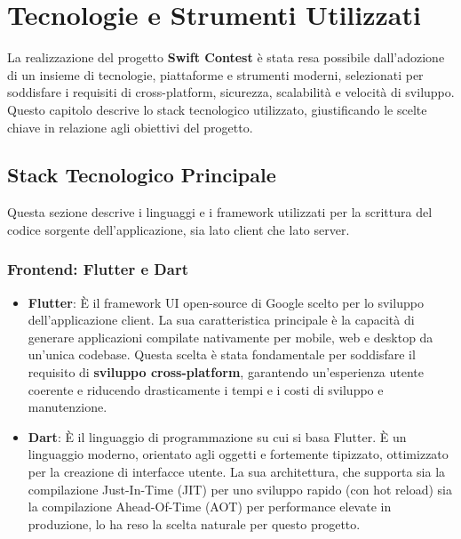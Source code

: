 
\chapter{Tecnologie e Strumenti Utilizzati}\label{ch:tecnologie-e-strumenti-utilizzati}

La realizzazione del progetto \textbf{Swift Contest} è stata resa possibile dall'adozione di un insieme di tecnologie, piattaforme e strumenti moderni, selezionati per soddisfare i requisiti di cross-platform, sicurezza, scalabilità e velocità di sviluppo.
Questo capitolo descrive lo stack tecnologico utilizzato, giustificando le scelte chiave in relazione agli obiettivi del progetto.

\section{Stack Tecnologico Principale}\label{sec:stack-tecnologico-principale}
Questa sezione descrive i linguaggi e i framework utilizzati per la scrittura del codice sorgente dell'applicazione, sia lato client che lato server.

\subsection{Frontend: Flutter e Dart}\label{subsec:frontend:-flutter-e-dart}
\begin{itemize}
	\item \textbf{Flutter}: È il framework UI open-source di Google scelto per lo sviluppo dell'applicazione client.
	La sua caratteristica principale è la capacità di generare applicazioni compilate nativamente per mobile, web e desktop da un'unica codebase.
	Questa scelta è stata fondamentale per soddisfare il requisito di \textbf{sviluppo cross-platform}, garantendo un'esperienza utente coerente e riducendo drasticamente i tempi e i costi di sviluppo e manutenzione.
	
	\item \textbf{Dart}: È il linguaggio di programmazione su cui si basa Flutter.
	È un linguaggio moderno, orientato agli oggetti e fortemente tipizzato, ottimizzato per la creazione di interfacce utente.
	La sua architettura, che supporta sia la compilazione Just-In-Time (JIT) per uno sviluppo rapido (con hot reload) sia la compilazione Ahead-Of-Time (AOT) per performance elevate in produzione, lo ha reso la scelta naturale per questo progetto.
\end{itemize}

